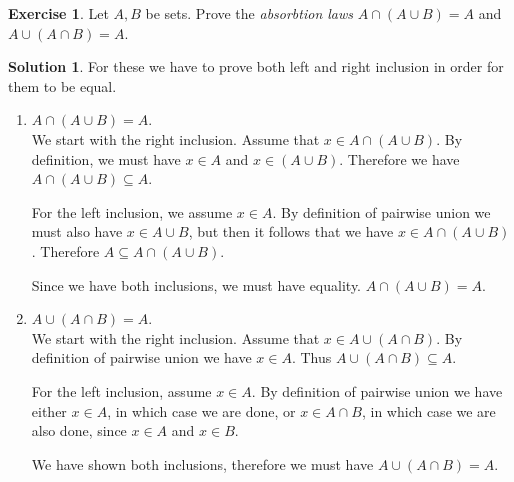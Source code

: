 \documentclass[a4paper, twocolumn]{report}
\newcounter{exercise} \numberwithin{exercise}{section}
\theoremstyle{definition}
\newtheorem{exc}[exercise]{Exercise}
\theoremstyle{solution}
\newtheorem*{sltn}{Solution}
\newcommand{\union}{\cup}
\newcommand{\intrsct}{\cap}
\begin{document}
\begin{exc}
  Let $A, B$ be sets. Prove the \textit{absorbtion laws} $A \intrsct (A \union
  B) = A$ and $A \union (A \intrsct B) = A$. 
\end{exc}

\begin{sltn}
  For these we have to prove both left and right inclusion in order for them to be equal.

  \begin{enumerate}
    \item $A \intrsct (A \union B) = A$. \\
      [0.2cm]
      We start with the right inclusion. Assume that $x \in A \intrsct (A
      \union B)$. By definition, we must have $x \in A$ and $x \in (A \union
      B)$. Therefore we have $A \intrsct (A \union B) \subseteq A$. 

      For the left inclusion, we assume $x \in A$. By definition of pairwise
      union we must also have $x \in A \union B$, but then it follows that we
      have $x \in A \intrsct (A \union B)$. Therefore $A \subseteq A \intrsct
      (A \union B)$.

      Since we have both inclusions, we must have equality.  $ A
      \intrsct (A \union B) = A$.

    \item $A \union (A \intrsct B) = A$. \\
      [0.2cm]
      We start with the right inclusion. Assume that $x \in A \union (A
      \intrsct B)$.  By definition of pairwise union we have $x \in A$. Thus $A
      \union (A \intrsct B) \subseteq A$.

      For the left inclusion, assume $x \in A$. By definition of pairwise union
      we have either $x \in A$, in which case we are done, or $x \in A \intrsct
      B$, in which case we are also done, since $x \in A$ and $x \in B$.
   
      We have shown both inclusions, therefore we must have $A \union (A
      \intrsct B) = A$.
  \end{enumerate}
\end{sltn}
\todos
\end{document}
